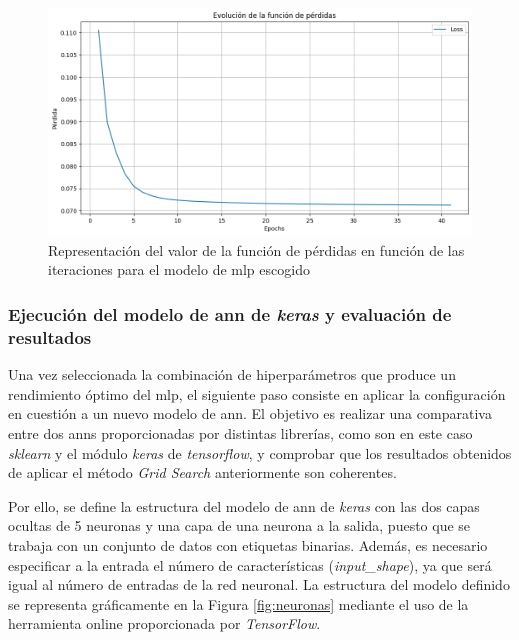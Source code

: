 \begin{figure}[H]
  \centering
  \includegraphics[width=1\textwidth]{img/desarrollo/ann/1mlpbestloss.png}
  \caption{Representación del valor de la función de pérdidas en función de las iteraciones para el modelo de \acrshort{mlp} escogido}
  \label{fig:1mlpbestloss}
\end{figure}

\subsubsection{Ejecución del modelo de \acrshort{ann} de \textit{keras} y evaluación de resultados}

Una vez seleccionada la combinación de hiperparámetros que produce un rendimiento óptimo del \gls{mlp}, el siguiente paso consiste en aplicar la configuración en cuestión a un nuevo modelo de \gls{ann}. El objetivo es realizar una comparativa entre dos \gls{ann}s proporcionadas por distintas librerías, como son en este caso \textit{sklearn} y el módulo \textit{keras} de \textit{tensorflow}, y comprobar que los resultados obtenidos de aplicar el método \textit{Grid Search} anteriormente son coherentes. 

\vspace{3mm}

Por ello, se define la estructura del modelo de \gls{ann} de \textit{keras} con las dos capas ocultas de 5 neuronas y una capa de una neurona a la salida, puesto que se trabaja con un conjunto de datos con etiquetas binarias. Además, es necesario especificar a la entrada el número de características (\textit{input\_shape}), ya que será igual al número de entradas de la red neuronal. La estructura del modelo definido se representa gráficamente en la Figura \ref{fig:neuronas} mediante el uso de la herramienta online proporcionada por \textit{TensorFlow}. \cite{seq}

